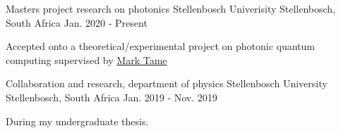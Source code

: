 

\begin{cventries}

  \cventry
    {Masters project research on photonics} %
    {Stellenbosch Univerisity} %
    {Stellenbosch, South Africa} %
    {Jan. 2020 - Present} %
    {
      \begin{cvitems} %
      \item  {Accepted onto a theoretical/experimental project on photonic
            quantum computing supervised by
        \href{http://quantumnanophotonics.org/}{Mark Tame}}
      \end{cvitems}
    }

  \cventry
    {Collaboration and research, department of physics} %
    {Stellenbosch University} %
    {Stellenbosch, South Africa} %
    {Jan. 2019 - Nov. 2019} %
    {
      \begin{cvitems} %
        \item {During my undergraduate thesis.}
      \end{cvitems}
    }

\end{cventries}
